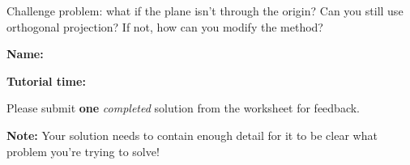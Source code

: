 \documentclass[12pt]{article}
\begin{document}
\begin{enumerate}
Challenge problem: what if the plane isn't through the origin? Can you still use orthogonal projection? If not, how can you modify the method?
 \end{enumerate}

\newpage

{\large \bf Name:}

\vspace{24pt}

{\large \bf Tutorial time:}

\vspace{24pt}

Please submit \textbf{one} \textit{completed} solution from the worksheet for feedback. 

\textbf{Note:} Your solution needs to contain enough detail for it to be clear what problem you're trying to solve!
\end{document}
